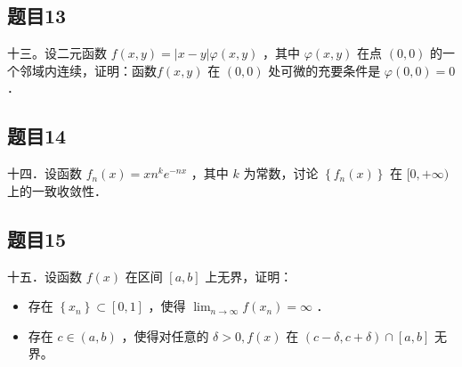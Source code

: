 \documentclass{article}
\begin{document}
\subsection{题目13}
十三。设二元函数 \(f(x, y)=|x-y| \varphi(x, y)\) ，其中 \(\varphi(x, y)\) 在点 \((0,0)\) 的一个邻域内连续，证明：函数\(f(x, y)\) 在 \((0,0)\) 处可微的充要条件是 \(\varphi(0,0)=0\) ．

\subsection{题目14}
十四．设函数 \(f_{n}(x)=x n^{k} e^{-n x}\) ，其中 \(k\) 为常数，讨论 \(\left\{f_{n}(x)\right\}\) 在 \([0,+\infty)\) 上的一致收敛性．

\subsection{题目15}
十五．设函数 \(f(x)\) 在区间 \([a, b]\) 上无界，证明：

\begin{itemize}
  \item[（1）] 存在 \(\left\{x_{n}\right\} \subset[0,1]\) ，使得 \(\lim _{n \rightarrow \infty} f\left(x_{n}\right)=\infty\) ．
  \item[（2）] 存在 \(c \in(a, b)\) ，使得对任意的 \(\delta>0, f(x)\) 在 \((c-\delta, c+\delta) \cap[a, b]\) 无界。
\end{itemize}
\end{document}
